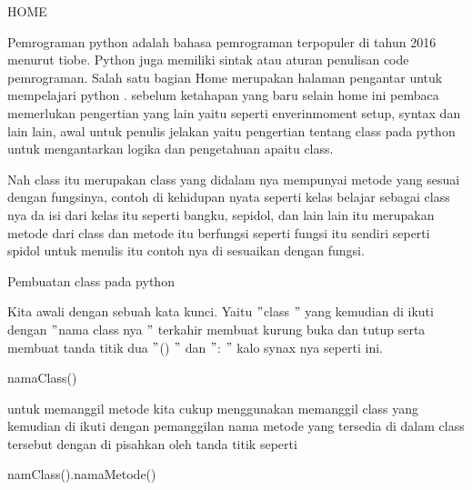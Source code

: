 
\sloppy
{\fontsize{14pt}{14pt}\selectfont HOME \\} \par
\noindent 
{\fontsize{14pt}{14pt}\selectfont Pemrograman python adalah bahasa pemrograman terpopuler di tahun 2016 menurut tiobe. Python juga memiliki sintak atau aturan penulisan code pemrograman. Salah satu bagian Home merupakan halaman pengantar untuk mempelajari python . sebelum ketahapan yang baru selain home ini pembaca memerlukan pengertian yang lain yaitu seperti enverinmoment setup, syntax dan lain lain, awal untuk penulis jelakan yaitu pengertian tentang class pada python untuk mengantarkan logika dan pengetahuan apaitu class. \\} \par
\vspace{14pt}
\noindent 
{\fontsize{14pt}{14pt}\selectfont Nah class itu merupakan class yang didalam nya mempunyai metode yang sesuai dengan fungsinya, contoh di kehidupan nyata seperti kelas belajar sebagai class nya da isi dari kelas itu seperti bangku, sepidol, dan lain lain itu merupakan metode dari class dan metode itu berfungsi seperti fungsi itu sendiri seperti spidol untuk menulis itu contoh nya di sesuaikan dengan fungsi. \\} \par
\vspace{14pt}
\noindent 
{\fontsize{14pt}{14pt}\selectfont Pembuatan class pada python  \\} \par
\noindent 
{\fontsize{14pt}{14pt}\selectfont Kita awali dengan sebuah kata kunci. Yaitu  $ " $class $ " $ yang kemudian di ikuti dengan  $ " $nama class nya $ " $ terkahir membuat kurung buka dan tutup serta membuat tanda titik dua  $ " $() $ " $ dan  $ " $: $ " $ kalo synax nya seperti ini. \\} \par
\vspace{14pt}
\noindent 
{\fontsize{14pt}{14pt}\selectfont namaClass() \\} \par
\vspace{14pt}
\noindent 
{\fontsize{14pt}{14pt}\selectfont untuk memanggil metode kita cukup menggunakan memanggil class yang kemudian di ikuti dengan pemanggilan nama metode yang tersedia di dalam class tersebut dengan di pisahkan oleh tanda titik seperti \\} \par
\vspace{14pt}
\noindent 
{\fontsize{14pt}{14pt}\selectfont namClass().namaMetode() \\} \par
